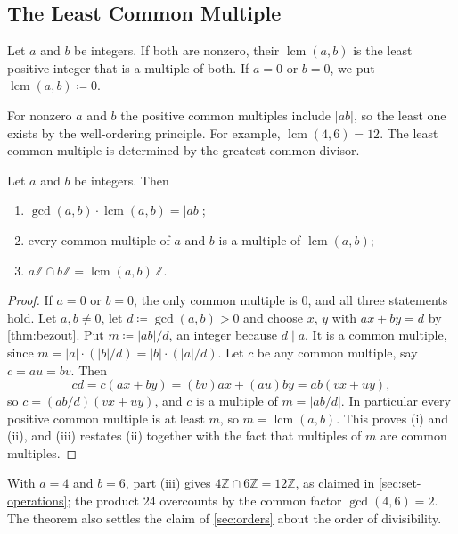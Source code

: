 \subsection{The Least Common Multiple}

\begin{definition}
\label{def:lcm}
Let $a$ and $b$ be integers. If both are nonzero, their  $\operatorname{lcm}(a,b)$ is the least positive integer that is a multiple of both. If $a=0$ or $b=0$, we put $\operatorname{lcm}(a,b)\coloneqq0$.
\end{definition}

For nonzero $a$ and $b$ the positive common multiples include $|ab|$, so the least one exists by the well-ordering principle. For example, $\operatorname{lcm}(4,6)=12$. The least common multiple is determined by the greatest common divisor.

\begin{theorem}
\label{thm:lcm}
Let $a$ and $b$ be integers. Then
\begin{enumerate}
\item $\gcd(a,b)\cdot\operatorname{lcm}(a,b)=|ab|$;
\item every common multiple of $a$ and $b$ is a multiple of $\operatorname{lcm}(a,b)$;
\item $a\mathbb Z\cap b\mathbb Z=\operatorname{lcm}(a,b)\,\mathbb Z$.
\end{enumerate}
\end{theorem}

\begin{proof}
If $a=0$ or $b=0$, the only common multiple is $0$, and all three statements hold. Let $a,b\ne0$, let $d\coloneqq\gcd(a,b)>0$ and choose $x$, $y$ with $ax+by=d$ by \cref{thm:bezout}. Put $m\coloneqq|ab|/d$, an integer because $d\mid a$. It is a common multiple, since $m=|a|\cdot(|b|/d)=|b|\cdot(|a|/d)$. Let $c$ be any common multiple, say $c=au=bv$. Then
\[
cd=c(ax+by)=(bv)ax+(au)by=ab(vx+uy),
\]
so $c=(ab/d)(vx+uy)$, and $c$ is a multiple of $m=|ab/d|$. In particular every positive common multiple is at least $m$, so $m=\operatorname{lcm}(a,b)$. This proves (i) and (ii), and (iii) restates (ii) together with the fact that multiples of $m$ are common multiples.
\end{proof}

With $a=4$ and $b=6$, part (iii) gives $4\mathbb Z\cap6\mathbb Z=12\mathbb Z$, as claimed in \cref{sec:set-operations}; the product $24$ overcounts by the common factor $\gcd(4,6)=2$. The theorem also settles the claim of \cref{sec:orders} about the order of divisibility.

